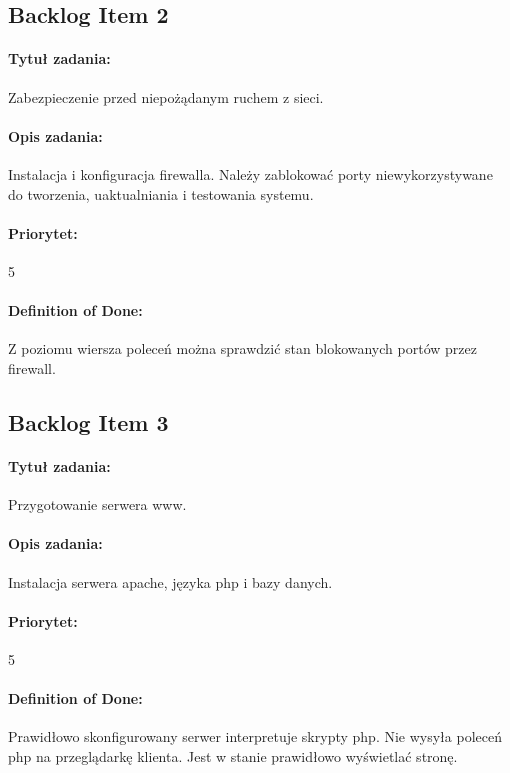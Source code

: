 \subsection{Backlog Item 2}
\paragraph{Tytuł zadania:}
Zabezpieczenie przed niepożądanym ruchem z sieci.

\paragraph{Opis zadania:}
Instalacja i konfiguracja firewalla. Należy zablokować porty niewykorzystywane do tworzenia, uaktualniania i testowania systemu.

\paragraph{Priorytet:}
5

\paragraph{Definition of Done:}
Z poziomu wiersza poleceń można sprawdzić stan blokowanych portów przez firewall.


\subsection{Backlog Item 3}
\paragraph{Tytuł zadania:}
Przygotowanie serwera www.

\paragraph{Opis zadania:}
Instalacja serwera apache, języka php i bazy danych.

\paragraph{Priorytet:}
5

\paragraph{Definition of Done:}
Prawidłowo skonfigurowany serwer interpretuje skrypty php. Nie wysyła poleceń php na przeglądarkę klienta. Jest w stanie prawidłowo wyświetlać stronę.

